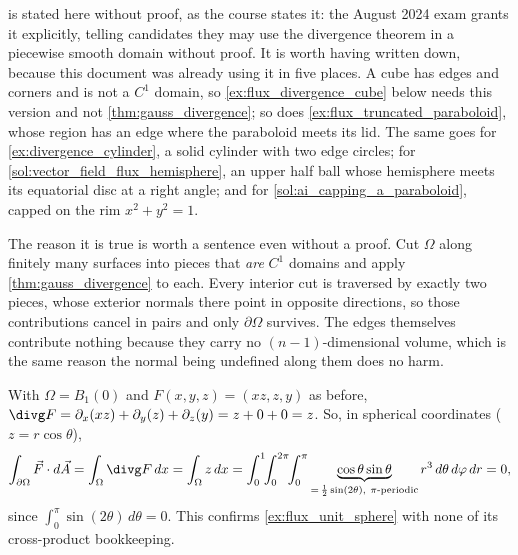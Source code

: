\begin{ainote}
 is stated here without proof, as the course states it: the
August 2024 exam grants it explicitly, telling candidates they may use the divergence theorem in a
piecewise smooth domain without proof. It is worth having written down, because this document was
already using it in five places. A cube has edges and corners and is not a $C^1$ domain, so
\cref{ex:flux_divergence_cube} below needs this version and not
\cref{thm:gauss_divergence}; so does \cref{ex:flux_truncated_paraboloid}, whose region has an edge
where the paraboloid meets its lid. The same goes for \cref{ex:divergence_cylinder}, a solid
cylinder with two edge circles; for \cref{sol:vector_field_flux_hemisphere}, an upper half ball
whose hemisphere meets its equatorial disc at a right angle; and for
\cref{sol:ai_capping_a_paraboloid}, capped on the rim $x^2+y^2=1$.

The reason it is true is worth a sentence even without a proof. Cut $\Omega$ along finitely many
surfaces into pieces that \emph{are} $C^1$ domains and apply \cref{thm:gauss_divergence} to each.
Every interior cut is traversed by exactly two pieces, whose exterior normals there point in
opposite directions, so those contributions cancel in pairs and only $\partial\Omega$ survives.
The edges themselves contribute nothing because they carry no $(n-1)$-dimensional volume, which is
the same reason the normal being undefined along them does no harm.
\end{ainote}

\begin{example}
\label{ex:flux_unit_sphere_via_divergence}
With $\Omega = B_1(0)$ and $F(x,y,z) = (xz,z,y)$ as before, $\divg F = \partial_x(xz) +
\partial_y(z) + \partial_z(y) = z + 0 + 0 = z$. So, in spherical coordinates ($z =
r\cos\theta$),
\[
\int_{\partial\Omega} \vec F\cdot d\vec A = \int_\Omega \divg F\,dx = \int_\Omega z\,dx
  = \int_0^1\!\!\int_0^{2\pi}\!\!\int_0^\pi \underbrace{\cos\theta\sin\theta}_{=\,\frac12\sin(2\theta),\
    \pi\text{-periodic}} r^3\,d\theta\,d\varphi\,dr = 0,
\]
since $\int_0^\pi \sin(2\theta)\,d\theta = 0$. This confirms \cref{ex:flux_unit_sphere} with none
of its cross-product bookkeeping.
\end{example}

